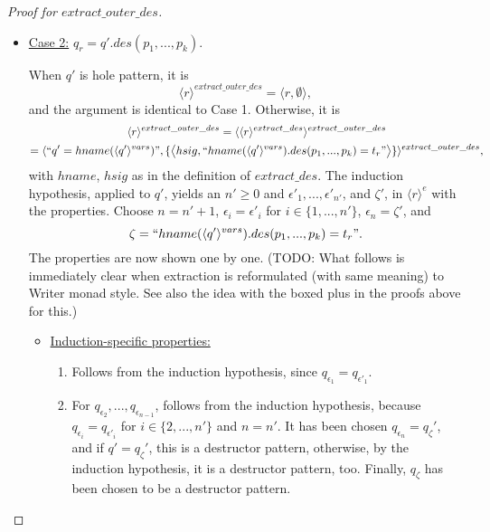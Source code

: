 \documentclass[11pt]{article} %
\begin{document}
\begin{proof}[Proof for $extract\_outer\_des$]
\begin{itemize}
\item \underline{Case 2:} $q_r = q'.des(p_1, ..., p_k)$.

When $q'$ is hole pattern, it is
\begin{equation*}
\langle r \rangle^{extract\_outer\_des} = \big\langle r, \emptyset \big\rangle,
\end{equation*}
and the argument is identical to Case 1. Otherwise, it is
\begin{multline*}
\langle r \rangle^{extract\_outer\_des} = \langle \langle r \rangle^{extract\_des} \rangle^{extract\_outer\_des}\\
= \langle `` q' = hname(\langle q' \rangle^{vars}) ", \{\big\langle hsig, `` hname(\langle q' \rangle^{vars}).des(p_1, ..., p_k) = t_r " \big\rangle \} \rangle^{extract\_outer\_des},
\end{multline*}
with $hname$, $hsig$ as in the definition of $extract\_des$. The induction hypothesis, applied to $q'$, yields an $n' \geq 0$ and $\epsilon'_1, ..., \epsilon'_{n'}$, and $\zeta'$, in $\langle r \rangle^e$ with the properties. Choose $n = n' + 1$, $\epsilon_i = \epsilon'_i$ for $i \in \{1, ..., n'\}$, $\epsilon_n = \zeta'$, and
\begin{equation*}
\zeta = `` hname(\langle q' \rangle^{vars}).des(p_1, ..., p_k) = t_r ".
\end{equation*} The properties are now shown one by one. (TODO: What follows is immediately clear when extraction is reformulated (with same meaning) to Writer monad style. See also the idea with the boxed plus in the proofs above for this.)
\begin{itemize}
\item \underline{Induction-specific properties:}
\begin{enumerate}
\item Follows from the induction hypothesis, since $q_{\epsilon_1} = q_{\epsilon'_1}$.
\item For $q_{\epsilon_2}, ..., q_{\epsilon_{n-1}}$, follows from the induction hypothesis, because $q_{\epsilon_i} = q_{\epsilon'_i}$ for $i \in \{2, ..., n'\}$ and $n = n'$. It has been chosen $q_{\epsilon_n} = q_\zeta'$, and if $q' = q_\zeta'$, this is a destructor pattern, otherwise, by the induction hypothesis, it is a destructor pattern, too. Finally, $q_\zeta$ has been chosen to be a destructor pattern.
\end{enumerate}


\end{itemize}
\end{itemize}
\end{proof}
\end{document}
